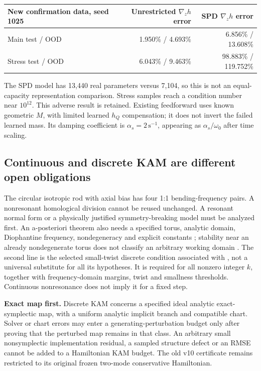 \begin{tabularx}{\textwidth}{@{}Xrr@{}}
\toprule
New confirmation data, seed 1025 & Unrestricted $\nabla_z h$ error & SPD $\nabla_z h$ error\\
\midrule
Main test / OOD & 1.950\% / 4.693\% & 6.856\% / 13.608\%\\
Stress test / OOD & 6.043\% / 9.463\% & 98.883\% / 119.752\%\\
\bottomrule
\end{tabularx}
The SPD model has 13,440 real parameters versus 7,104, so this is not an equal-capacity representation comparison. Stress samples reach a condition number near $10^{12}$. This adverse result is retained. Existing feedforward uses known geometric $M$, with limited learned $h_Q$ compensation; it does not invert the failed learned mass. Its damping coefficient is $\alpha_s=2\,\mathrm{s}^{-1}$, appearing as $\alpha_s/\omega_0$ after time scaling.

\subsection{Continuous and discrete KAM are different open obligations}
The circular isotropic rod with axial bias has four 1:1 bending-frequency pairs. A nonresonant homological division cannot be reused unchanged. A resonant normal form or a physically justified symmetry-breaking model must be analyzed first. An a-posteriori theorem also needs a specified torus, analytic domain, Diophantine frequency, nondegeneracy and explicit constants \citep{haroluque2019}; stability near an already nondegenerate torus does not classify an arbitrary working domain \citep{bounemoura2016}.
\EqKAMDivisors
The second line is the selected small-twist discrete condition associated with \citet{shang1999}, not a universal substitute for all its hypotheses. It is required for all nonzero integer $k$, together with frequency-domain margins, twist and smallness thresholds. Continuous nonresonance does not imply it for a fixed step.

\textbf{Exact map first.} Discrete KAM concerns a specified ideal analytic exact-symplectic map, with a uniform analytic implicit branch and compatible chart. Solver or chart errors may enter a generating-perturbation budget only after proving that the perturbed map remains in that class. An arbitrary small nonsymplectic implementation residual, a sampled structure defect or an RMSE cannot be added to a Hamiltonian KAM budget. The old v10 certificate remains restricted to its original frozen two-mode conservative Hamiltonian.

